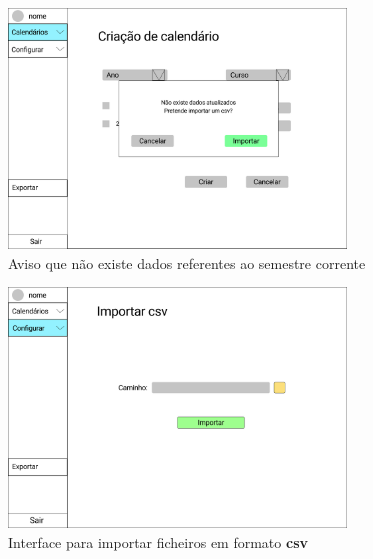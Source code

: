 \documentclass[11pt, twoside]{report}
\begin{document}
\begin{figure}[H] 
	\centering 
	\includegraphics[width=0.8\textwidth,height=0.8\textheight,keepaspectratio]{image/prototipowireframes/criarCalendariosAviso}
	\caption{Aviso que não existe dados referentes ao semestre corrente}
	\label{avisoimportarcsv}
\end{figure}


\begin{figure}[H] 
	\centering 
	\includegraphics[width=0.8\textwidth,height=0.8\textheight,keepaspectratio]{image/prototipowireframes/importar}
	\caption{Interface para importar ficheiros em formato \textbf{csv}}
	\label{importarcsv}
\end{figure}
\end{document}
